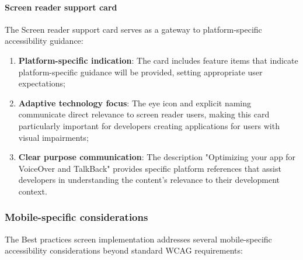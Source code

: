 \paragraph{Screen reader support card}

The Screen reader support card serves as a gateway to platform-specific accessibility guidance:

\begin{enumerate}
    \item \textbf{Platform-specific indication}: The card includes feature items that indicate platform-specific guidance will be provided, setting appropriate user expectations;
    
    \item \textbf{Adaptive technology focus}: The eye icon and explicit naming communicate direct relevance to screen reader users, making this card particularly important for developers creating applications for users with visual impairments;
    
    \item \textbf{Clear purpose communication}: The description "Optimizing your app for VoiceOver and TalkBack" provides specific platform references that assist developers in understanding the content's relevance to their development context.
\end{enumerate}

\subsubsection{Mobile-specific considerations}

The Best practices screen implementation addresses several mobile-specific accessibility considerations beyond standard WCAG requirements:

